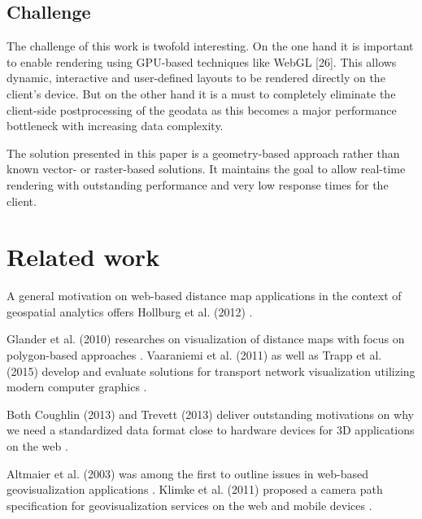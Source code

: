 \documentclass{motivation}
\begin{document}
\subsection{Challenge}
  The challenge of this work is twofold interesting. On the one hand it is important to enable rendering using GPU-based techniques like WebGL [26]. This allows dynamic, interactive and user-defined layouts to be rendered directly on the client's device. But on the other hand it is a must to completely eliminate the client-side postprocessing of the geodata as this becomes a major performance bottleneck with increasing data complexity.\par
  The solution presented in this paper is a geometry-based approach rather than known vector- or raster-based solutions. It maintains the goal to allow real-time rendering with outstanding performance and very low response times for the client.

\section{Related work}
  A general motivation on web-based distance map applications in the context of geospatial analytics offers Hollburg et al. (2012) \cite{hollburghier}.\par
  Glander et al. (2010) researches on visualization of distance maps with focus on polygon-based approaches \cite{glandererreichbarkeitskarten}. Vaaraniemi et al. (2011) as well as Trapp et al. (2015) develop and evaluate solutions for transport network visualization utilizing modern computer graphics \cite{vaaraniemi2011high}\cite{trapp2014interactive}.\par
  Both Coughlin (2013) and Trevett (2013) deliver outstanding motivations on why we need a standardized data format close to hardware devices for 3D applications on the web \cite{coughlin3d}\cite{trevett20123d}.\par
  Altmaier et al. (2003) was among the first to outline issues in web-based geovisualization applications \cite{altmaier2003applications}. Klimke et al. (2011) proposed a camera path specification for geovisualization services on the web and mobile devices \cite{klimke2013service}.
\end{document}
